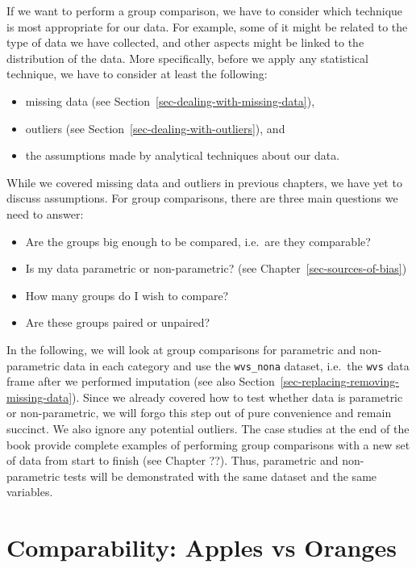 \documentclass[
  letterpaper,
]{krantz}
\begin{document}
If we want to perform a group comparison, we have to consider which
technique is most appropriate for our data. For example, some of it
might be related to the type of data we have collected, and other
aspects might be linked to the distribution of the data. More
specifically, before we apply any statistical technique, we have to
consider at least the following:

\begin{itemize}
\item
  missing data (see Section~\ref{sec-dealing-with-missing-data}),
\item
  outliers (see Section~\ref{sec-dealing-with-outliers}), and
\item
  the assumptions made by analytical techniques about our data.
\end{itemize}

While we covered missing data and outliers in previous chapters, we have
yet to discuss assumptions. For group comparisons, there are three main
questions we need to answer:

\begin{itemize}
\item
  Are the groups big enough to be compared, i.e.~are they comparable?
\item
  Is my data parametric or non-parametric? (see
  Chapter~\ref{sec-sources-of-bias})
\item
  How many groups do I wish to compare?
\item
  Are these groups paired or unpaired?
\end{itemize}

In the following, we will look at group comparisons for parametric and
non-parametric data in each category and use the \texttt{wvs\_nona}
dataset, i.e.~the \texttt{wvs} data frame after we performed imputation
(see also Section~\ref{sec-replacing-removing-missing-data}). Since we
already covered how to test whether data is parametric or
non-parametric, we will forgo this step out of pure convenience and
remain succinct. We also ignore any potential outliers. The case studies
at the end of the book provide complete examples of performing group
comparisons with a new set of data from start to finish (see Chapter
??). Thus, parametric and non-parametric tests will be demonstrated with
the same dataset and the same variables.

\section{Comparability: Apples vs
Oranges}\label{sec-comparability-apples-vs-oranges}
\end{document}
